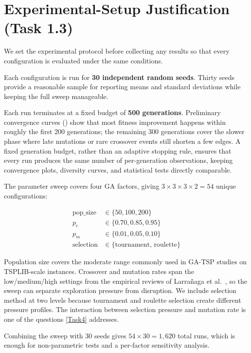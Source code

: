 \section{Experimental-Setup Justification (Task 1.3)}
\label{T1:Setup}

We set the experimental protocol before collecting any results so that every
configuration is evaluated under the same conditions.

Each configuration is run for \textbf{30 independent random seeds}. Thirty
seeds provide a reasonable sample for reporting means and standard deviations
while keeping the full sweep manageable.

Each run terminates at a fixed budget of \textbf{500 generations}.
Preliminary convergence curves () show that most fitness
improvement happens within roughly the first 200 generations; the remaining
300 generations cover the slower phase where late mutations or rare crossover
events still shorten a few edges. A fixed generation budget, rather than an adaptive stopping
rule, ensures that every run produces the same number of per-generation
observations, keeping convergence plots, diversity curves, and statistical
tests directly comparable.

The parameter sweep covers four GA factors, giving
$3 \times 3 \times 3 \times 2 = 54$ unique configurations:

\begin{align*}
	\text{pop\_size} &\in \{50, 100, 200\} \\
	p_c &\in \{0.70, 0.85, 0.95\} \\
	p_m &\in \{0.01, 0.05, 0.10\} \\
	\text{selection} &\in \{\text{tournament},\, \text{roulette}\}
\end{align*}

Population size covers the moderate range commonly used in GA-TSP studies on
TSPLIB-scale instances. Crossover and mutation rates span the
low/medium/high settings from the empirical reviews of Larra{\~n}aga et
al.~\cite{larranaga1999genetic}, so the sweep can separate exploration
pressure from disruption. We include selection method at two levels because
tournament and roulette selection create different pressure
profiles. The interaction between selection pressure and mutation rate is
one of the questions \cref{Task4} addresses.

Combining the sweep with 30 seeds gives $54 \times 30 = 1{,}620$ total runs,
which is enough for non-parametric tests and a per-factor sensitivity
analysis.

